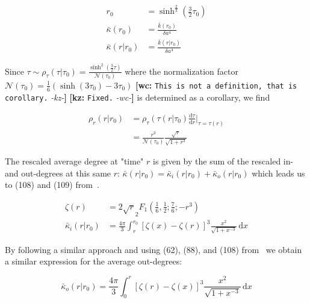 \documentclass[preprint,notitlepage,amsmath,amssymb,floatfix]{revtex4-1}
\newcommand{\XXX}[3]{{\bf [#1: } {\tt #3} {\it -#2-}{\bf ]}}
\begin{document}
\begin{align}
r_0 &= \sinh^{\frac{2}{3}}\left(\frac{3}{2}\tau_0\right) \\
\bar\kappa\left(r_0\right) &= \frac{\bar k\left(r_0\right)}{\delta a^4} \\
\bar\kappa\left(r|r_0\right) &= \frac{\bar k\left(r|r_0\right)}{\delta a^4}
\end{align}

\noindent Since $\tau \sim \rho_\tau\left(\tau|\tau_0\right) = \frac{\sinh^2\left(\frac{3}{2}\tau\right)}{\mathcal{N}\left(\tau_0\right)}$ where the normalization factor $\mathcal{N}\left(\tau_0\right) = \frac{1}{6}\left(\sinh\left(3\tau_0\right) - 3\tau_0\right)$ \XXX{wc}{kz}{This is not a definition, that is corollary.} \XXX{kz}{wc}{Fixed.} is determined as a corollary, we find

\begin{equation}
\begin{split}
\rho_r\left(r|r_0\right) &= \rho_\tau\left(\tau\left(r\right|\tau_0\right)\frac{\mathrm d\tau}{\mathrm dr}|_{\tau=\tau\left(r\right)} \\
 &= \frac{r^3}{\mathcal{N}\left(\tau_0\right)}\frac{\sqrt r}{\sqrt{1+r^3}}
\end{split}
\end{equation}

\noindent The rescaled average degree at "time" $r$ is given by the sum of the rescaled in- and out-degrees at this same $r$:  $\bar\kappa\left(r|r_0\right) = \bar\kappa_i\left(r|r_0\right) + \bar\kappa_o\left(r|r_0\right)$ which leads us to (108) and (109) from~\cite{ref:snc2012}.

\begin{align}
\zeta\left(r\right) &= 2\sqrt r _2F_1\left(\frac{1}{6},\frac{1}{2};\frac{7}{6}; -r^3\right) \\
\bar\kappa_i\left(r|r_0\right) &= \frac{4\pi}{3}\int_r^{r_0}\!\left[\zeta\left(x\right)-\zeta\left(r\right)\right]^3\frac{x^2}{\sqrt{1+x^{-3}}}\,\mathrm dx
\end{align}

\noindent By following a similar approach and using (62), (88), and (108) from~\cite{ref:snc2012} we obtain a similar expression for the average out-degrees:

\begin{equation}
\bar\kappa_o\left(r|r_0\right) = \frac{4\pi}{3}\int_0^r\!\left[\zeta\left(r\right) - \zeta\left(x\right)\right]^3\frac{x^2}{\sqrt{1+x^{-3}}}\,\mathrm dx
\end{equation}
\end{document}
